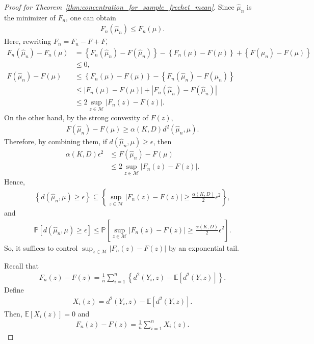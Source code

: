 \begin{proof}[Proof for Theorem~\ref{thm:concentration_for_sample_frechet_mean}]
    Since $\hat{\mu}_n$ is the minimizer of $F_n$, one can obtain
    \begin{align*}
        F_n(\hat{\mu}_n) \leq F_n(\mu).
    \end{align*}
    Here, rewriting $F_n = F_n - F + F$,
    \begin{align*}
        F_n(\hat{\mu}_n) - F_n(\mu) &= \left\{F_n(\hat{\mu}_n) - F(\hat{\mu}_n)\right\} - \left\{F_n(\mu) - F(\mu)\right\} + \left\{F(\mu_n) - F(\mu)\right\} \\
        &\leq 0, \\
        F(\hat{\mu}_n) - F(\mu) &\leq \left\{F_n(\mu) - F(\mu)\right\} - \left\{F_n(\hat{\mu}_n) - F(\hat{\mu}_n)\right\} \\
        &\leq \left|F_n(\mu) - F(\mu)\right| + \left|F_n(\hat{\mu}_n) - F(\hat{\mu}_n)\right| \\
        &\leq 2\sup_{z \in \mathcal{M}}\left|F_n(z) - F(z)\right|.
    \end{align*}
    On the other hand, by the strong convexity of $F(z)$,
    \begin{align*}
        F(\hat{\mu}_n) - F(\mu) \geq \alpha(K, D) d^2(\hat{\mu}_n, \mu).
    \end{align*}
    Therefore, by combining them, if $d(\hat{\mu}_n, \mu) \geq \epsilon$, then
    \begin{align*}
        \alpha(K, D)\epsilon^2 &\leq F(\hat{\mu}_n) - F(\mu) \\
        &\leq 2\sup_{z \in \mathcal{M}}\left|F_n(z) - F(z)\right|.
    \end{align*}
    Hence,
    \begin{align*}
        \left\{d(\hat{\mu}_n, \mu) \geq \epsilon \right\} \subseteq \left\{\sup_{z \in \mathcal{M}} \left|F_n(z) - F(z) \right| \geq \frac{\alpha(K, D)}{2}\epsilon^2 \right\},
    \end{align*}
    and
    \begin{align*}
        \mathbb{P}\left[d(\hat{\mu}_n, \mu) \geq \epsilon \right] \leq \mathbb{P}\left[\sup_{z \in \mathcal{M}}\left|F_n(z) - F(z) \right| \geq \frac{\alpha(K, D)}{2}\epsilon^2 \right].
    \end{align*}
    So, it suffices to control $\sup_{z \in \mathcal{M}} \left|F_n(z) - F(z) \right|$ by an exponential tail.

    Recall that
    \begin{align*}
        F_n(z) - F(z) = \frac{1}{n}\sum^n_{i=1}\left\{d^2(Y_i, z) - \mathbb{E}[d^2(Y, z)]\right\}.
    \end{align*}
    Define
    \begin{align*}
        X_i(z) = d^2(Y_i, z) - \mathbb{E}[d^2(Y, z)].
    \end{align*}
    Then, $\mathbb{E}[X_i(z)] = 0$ and
    \begin{align*}
        F_n(z) - F(z) = \frac{1}{n}\sum^n_{i=1} X_i(z).
    \end{align*}


\end{proof}
